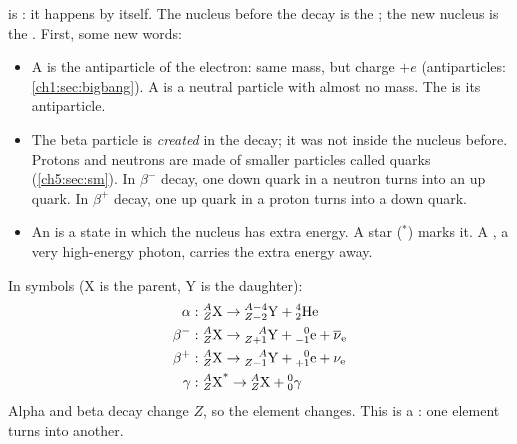 is : it happens by itself. The nucleus
before the decay is the ; the new nucleus is the .
First, some new words:
\begin{itemize}
  \item A  is the antiparticle of the electron: same mass, but charge
        $+e$ (antiparticles: \cref{ch1:sec:bigbang}). A  is a neutral particle
        with almost no mass. The  is its antiparticle.
  \item The beta particle is \emph{created} in the decay; it was not inside the
        nucleus before. Protons and neutrons are made of smaller particles called
        quarks (\cref{ch5:sec:sm}). In $\beta^-$ decay, one down quark in a neutron
        turns into an up quark. In $\beta^+$ decay, one up quark in a proton turns
        into a down quark.
  \item An  is a state in which the nucleus has extra energy. A
        star ($^{*}$) marks it. A , a very high-energy photon, carries
        the extra energy away.
\end{itemize}
In symbols (X is the parent, Y is the daughter):
\begin{align*}
  \alpha:\ & \chFourNuc{A}{Z}{X} \to \chFourNuc{A-4}{Z-2}{Y} + \chFourAlpha\\
  \beta^-:\ & \chFourNuc{A}{Z}{X} \to \chFourNuc{A}{Z+1}{Y} + \chFourBeta + \chFourAnu\\
  \beta^+:\ & \chFourNuc{A}{Z}{X} \to \chFourNuc{A}{Z-1}{Y} + \chFourPos + \chFourNu\\
  \gamma:\ & \chFourNuc{A}{Z}{X}^{*} \to \chFourNuc{A}{Z}{X} + \chFourGam
\end{align*}
Alpha and beta decay change $Z$, so the element changes. This is a
: one element turns into another.


